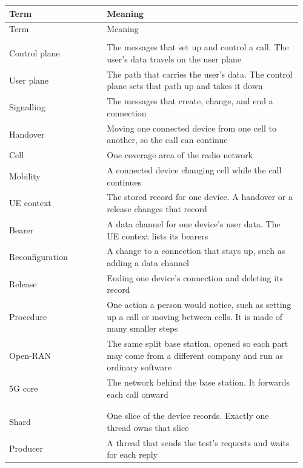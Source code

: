 \documentclass[english,oneside,a4paper,censored,csm,software-track-2020]{HYthesisML}
\begin{document}
\begingroup
\singlespacing
\setlength{\tabcolsep}{3pt}
\renewcommand{\arraystretch}{1.05}
\begin{longtable}{@{}>{\scriptsize\raggedright\arraybackslash}p{0.32\linewidth} >{\scriptsize\raggedright\arraybackslash}p{0.64\linewidth}@{}}
\hline\hline
Term & Meaning \\
\hline
\endfirsthead
\hline\hline
Term & Meaning \\
\hline
\endhead
\multicolumn{2}{@{}l}{\scriptsize\emph{Network}}\\*[1pt]
Control plane & The messages that set up and control a call. The user's data travels on the user plane \\
User plane & The path that carries the user's data. The control plane sets that path up and takes it down \\
Signalling & The messages that create, change, and end a connection \\
Handover & Moving one connected device from one cell to another, so the call can continue \\
Cell & One coverage area of the radio network \\
Mobility & A connected device changing cell while the call continues \\
UE context & The stored record for one device. A handover or a release changes that record \\
Bearer & A data channel for one device's user data. The UE context lists its bearers \\
Reconfiguration & A change to a connection that stays up, such as adding a data channel \\
Release & Ending one device's connection and deleting its record \\
Procedure & One action a person would notice, such as setting up a call or moving between cells. It is made of many smaller steps \\
Open-RAN & The same split base station, opened so each part may come from a different company and run as ordinary software \\
5G core & The network behind the base station. It forwards each call onward \\
\\[2pt]
\multicolumn{2}{@{}l}{\scriptsize\emph{The service}}\\*[1pt]
Shard & One slice of the device records. Exactly one thread owns that slice \\
Producer & A thread that sends the test's requests and waits for each reply \\

\end{longtable}
\end{document}

